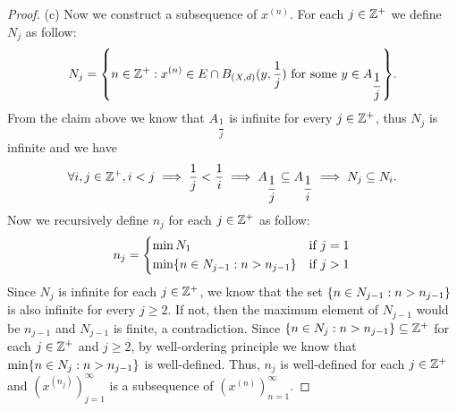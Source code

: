 \begin{proof}{(c)}
  Now we construct a subsequence of \(x^{(n)}\).
  For each \(j \in \mathbb{Z}^+\) we define \(N_j\) as follow:
  \[
    N_j = \set{n \in \Z^+ : x^{(n)} \in E \cap B_{(X, d)}(y, \dfrac{1}{j}) \text{ for some } y \in A_{\dfrac{1}{j}}}.
  \]
  From the claim above we know that \(A_{\dfrac{1}{j}}\) is infinite for every \(j \in \mathbb{Z}^+\), thus \(N_j\) is infinite and we have
  \[
    \forall i, j \in \mathbb{Z}^+, i < j \implies \dfrac{1}{j} < \dfrac{1}{i} \implies A_{\dfrac{1}{j}} \subseteq A_{\dfrac{1}{i}} \implies N_j \subseteq N_i.
  \]
  Now we recursively define \(n_j\) for each \(j \in \mathbb{Z}^+\) as follow:
  \[
    n_j = \begin{dcases}
      \min N_1                                  & \text{if } j = 1 \\
      \min\set{n \in N_{j - 1} : n > n_{j - 1}} & \text{if } j > 1
    \end{dcases}
  \]
  Since \(N_j\) is infinite for each \(j \in \mathbb{Z}^+\), we know that the set \(\left\lbrace n \in N_{j - 1} : n > n_{j - 1}\right\rbrace\) is also infinite for every \(j \geq 2\).
  If not, then the maximum element of \(N_{j - 1}\) would be \(n_{j - 1}\) and \(N_{j - 1}\) is finite, a contradiction.
  Since \(\left\lbrace n \in N_j : n > n_{j - 1}\right\rbrace \subseteq \mathbb{Z}^+\) for each \(j \in \mathbb{Z}^+\) and \(j \geq 2\), by well-ordering principle we know that \(\min\set{n \in N_j : n > n_{j - 1}}\) is well-defined.
  Thus, \(n_j\) is well-defined for each \(j \in \mathbb{Z}^+\) and \((x^{(n_j)})_{j = 1}^\infty\) is a subsequence of \((x^{(n)})_{n = 1}^\infty\).


\end{proof}
